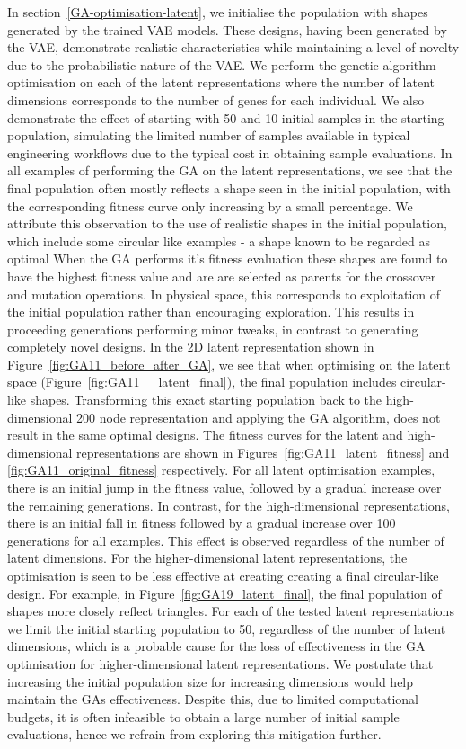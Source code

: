 \documentclass{article}
\begin{document}
In section~\ref{GA-optimisation-latent}, we initialise the population with shapes generated by the trained VAE models. These designs, having been generated by the VAE, demonstrate realistic characteristics while maintaining a level of novelty due to the probabilistic nature of the VAE. We perform the genetic algorithm optimisation on each of the latent representations where the number of latent dimensions corresponds to the number of genes for each individual. We also demonstrate the effect of starting with 50 and 10 initial samples in the starting population, simulating the limited number of samples available in typical engineering workflows due to the typical cost in obtaining sample evaluations. In all examples of performing the GA on the latent representations, we see that the final population often mostly reflects a shape seen in the initial population, with the corresponding fitness curve only increasing by a small percentage. We attribute this observation to the use of realistic shapes in the initial population, which include some circular like examples - a shape known to be regarded as optimal When the GA performs it's fitness evaluation these shapes are found to have the highest fitness value and are are selected as parents for the crossover and mutation operations. In physical space, this corresponds to exploitation of the initial population rather than encouraging exploration. This results in proceeding generations performing minor tweaks, in contrast to generating completely novel designs. 
In the 2D latent representation shown in Figure~\ref{fig:GA11_before_after_GA}, we see that when optimising on the latent space (Figure~\ref{fig:GA11__latent_final}), the final population includes circular-like shapes. Transforming this exact starting population back to the high-dimensional 200 node representation and applying the GA algorithm, does not result in the same optimal designs. The fitness curves for the latent and high-dimensional representations are shown in Figures~\ref{fig:GA11_latent_fitness} and \ref{fig:GA11_original_fitness} respectively. For all latent optimisation examples, there is an initial jump in the fitness value, followed by a gradual increase over the remaining generations. In contrast, for the high-dimensional representations, there is an initial fall in fitness followed by a gradual increase over 100 generations for all examples. This effect is observed regardless of the number of latent dimensions. For the higher-dimensional latent representations, the optimisation is seen to be less effective at creating creating a final circular-like design. For example, in Figure~\ref{fig:GA19_latent_final}, the final population of shapes more closely reflect triangles. For each of the tested latent representations we limit the initial starting population to 50,  regardless of the number of latent dimensions, which is a probable cause for the loss of effectiveness in the GA optimisation for higher-dimensional latent representations. We postulate that increasing the initial population size for increasing dimensions would help maintain the GAs effectiveness. Despite this, due to limited computational budgets, it is often infeasible to obtain a large number of initial sample evaluations, hence we refrain from exploring this mitigation further.
\end{document}
